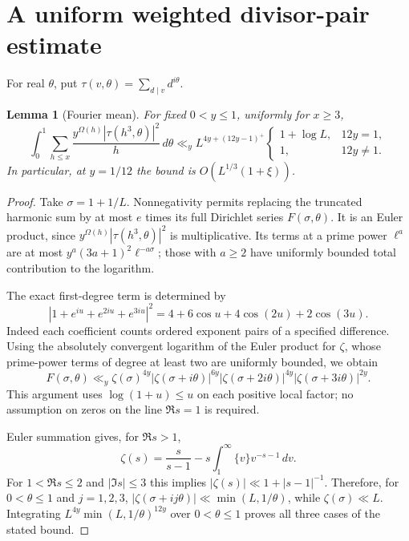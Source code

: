 \documentclass[11pt,a4paper]{article}
\newtheorem{lemma}[theorem]{Lemma}
\newcommand{\Om}{\Omega}
\newcommand{\dd}{\,d}
\begin{document}
\section{A uniform weighted divisor-pair estimate}
For real $\theta$, put
$\tau(v,\theta)=\sum_{d\mid v}d^{i\theta}$.

\begin{lemma}[Fourier mean]\label{fourier}
For fixed $0<y\le1$, uniformly for $x\ge3$,
\[
 \int_0^1\sum_{h\le x}
       \frac{y^{\Om(h)}|\tau(h^3,\theta)|^2}{h}\dd\theta
 \ll_y L^{4y+(12y-1)^+}
       \begin{cases}1+\log L,&12y=1,\\1,&12y\ne1.\end{cases}
\]
In particular, at $y=1/12$ the bound is $O(L^{1/3}(1+\xi))$.
\end{lemma}
\begin{proof}
Take $\sigma=1+1/L$. Nonnegativity permits replacing the truncated
harmonic sum by at most $e$ times its full Dirichlet series
$F(\sigma,\theta)$. It is an Euler product, since
$y^{\Om(h)}|\tau(h^3,\theta)|^2$ is multiplicative.
Its terms at a prime power $\ell^a$ are at most
$y^a(3a+1)^2\ell^{-a\sigma}$; those with $a\ge2$ have uniformly
bounded total contribution to the logarithm.

The exact first-degree term is determined by
\begin{equation}\label{polynomial}
 |1+e^{iu}+e^{2iu}+e^{3iu}|^2
 =4+6\cos u+4\cos(2u)+2\cos(3u).
\end{equation}
Indeed each coefficient counts ordered exponent pairs of a specified
difference. Using the absolutely convergent logarithm of the Euler
product for $\zeta$, whose prime-power terms of degree at least two
are uniformly bounded, we obtain
\[
 F(\sigma,\theta)\ll_y
 \zeta(\sigma)^{4y}
 |\zeta(\sigma+i\theta)|^{6y}
 |\zeta(\sigma+2i\theta)|^{4y}
 |\zeta(\sigma+3i\theta)|^{2y}.
\]
This argument uses $\log(1+u)\le u$ on each positive local factor;
no assumption on zeros on the line $\Re s=1$ is required.

Euler summation gives, for $\Re s>1$,
\[
 \zeta(s)=\frac{s}{s-1}-s\int_1^\infty\{v\}v^{-s-1}\dd v.
\]
For $1<\Re s\le2$ and $|\Im s|\le3$ this implies
$|\zeta(s)|\ll1+|s-1|^{-1}$.
Therefore, for $0<\theta\le1$ and $j=1,2,3$,
$|\zeta(\sigma+ij\theta)|\ll\min(L,1/\theta)$, while
$\zeta(\sigma)\ll L$. Integrating
$L^{4y}\min(L,1/\theta)^{12y}$ over $0<\theta\le1$ proves
all three cases of the stated bound.
\end{proof}
\end{document}
